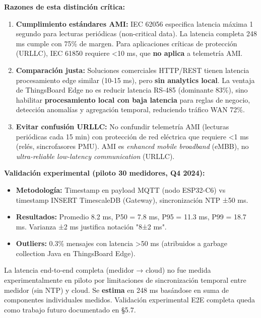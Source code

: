 \textbf{Razones de esta distinción crítica:}

\begin{enumerate}
    \item \textbf{Cumplimiento estándares AMI:} IEC 62056 especifica latencia máxima 1 segundo para lecturas periódicas (non-critical data). La latencia completa 248 ms cumple con 75\% de margen. Para aplicaciones críticas de protección (URLLC), IEC 61850 requiere <10 ms, que \textbf{no aplica} a telemetría AMI.
    
    \item \textbf{Comparación justa:} Soluciones comerciales HTTP/REST tienen latencia procesamiento edge similar (10-15 ms), pero \textbf{sin analytics local}. La ventaja de ThingsBoard Edge no es reducir latencia RS-485 (dominante 83\%), sino habilitar \textbf{procesamiento local con baja latencia} para reglas de negocio, detección anomalías y agregación temporal, reduciendo tráfico WAN 72\%.
    
    \item \textbf{Evitar confusión URLLC:} No confundir telemetría AMI (lecturas periódicas cada 15 min) con protección de red eléctrica que requiere <1 ms (relés, sincrofasores PMU). AMI es \textit{enhanced mobile broadband} (eMBB), no \textit{ultra-reliable low-latency communication} (URLLC).
\end{enumerate}

\textbf{Validación experimental (piloto 30 medidores, Q4 2024):}

\begin{itemize}
    \item \textbf{Metodología:} Timestamp en payload MQTT (nodo ESP32-C6) vs timestamp INSERT TimescaleDB (Gateway), sincronización NTP ±50 ms.
    \item \textbf{Resultados:} Promedio 8.2 ms, P50 = 7.8 ms, P95 = 11.3 ms, P99 = 18.7 ms. Varianza ±2 ms justifica notación "8±2 ms".
    \item \textbf{Outliers:} 0.3\% mensajes con latencia >50 ms (atribuidos a garbage collection Java en ThingsBoard Edge).
\end{itemize}

La latencia end-to-end completa (medidor → cloud) no fue medida experimentalmente en piloto por limitaciones de sincronización temporal entre medidor (sin NTP) y cloud. Se \textbf{estima} en 248 ms basándose en suma de componentes individuales medidos. Validación experimental E2E completa queda como trabajo futuro documentado en §5.7.

